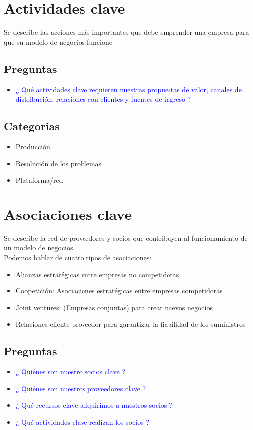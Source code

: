 \documentclass[11pt]{book}
\begin{document}
\chapter{Actividades clave}
Se describe las acciones más importantes que debe emprender una empresa para que su modelo de negocios funcione
\section{Preguntas}
\begin{itemize}
\item\textcolor{blue}{¿ Qué actividades clave requieren nuestras propuestas de valor, canales de distribución, relaciones con clientes y fuentes de ingreso ?}
\end{itemize}
\section{Categorias}
\begin{itemize}
\item Producción 
\item Resolución de los problemas
\item Plataforma/red
\end{itemize}
\chapter{Asociaciones clave}
Se describe la red de proveedores y socios que contribuyen al funcionamiento de un modelo de negocios.\\
Podemos hablar de cuatro tipos de asociaciones:\\
\begin{itemize}
\item Alianzas estratégicas entre empresas no competidoras
\item Coopetición: Asociaciones estratégicas entre empresas competidoras
\item Joint ventures: (Empresas conjuntas) para crear nuevos negocios
\item Relaciones cliente-proveedor para garantizar la fiabilidad de los suministros
\end{itemize}
\section{Preguntas}
\begin{itemize}
\item\textcolor{blue}{¿ Quiénes son nuestro socios clave ?}
\item\textcolor{blue}{¿ Quiénes son nuestros proveedores clave ?}
\item\textcolor{blue}{¿ Qué recursos clave adquirimos a nuestros socios ?}
\item\textcolor{blue}{¿ Qué actividades clave realizan los socios ?}
\end{itemize}
\end{document}
